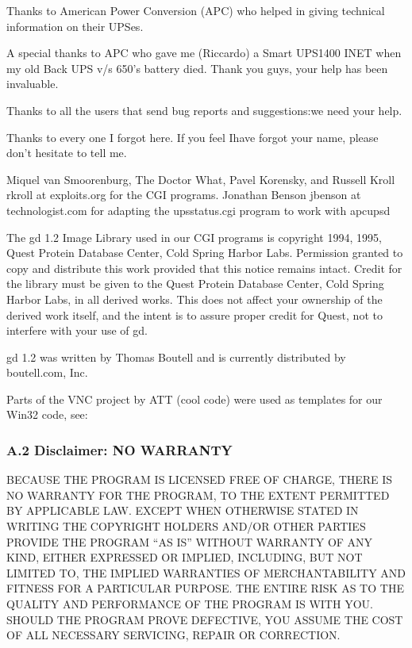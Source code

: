 Thanks to American Power Conversion (APC) who helped in giving technical
information on their UPSes.  

A special thanks to APC who gave me (Riccardo) a Smart UPS1400 INET when my
old Back UPS v/s 650's battery died.  Thank you guys, your help has been
invaluable.  

Thanks to all the users that send bug reports and suggestions:we need your
help.  

Thanks to every one I forgot here. If you feel Ihave forgot your name, please
don't hesitate to tell me.  

Miquel van Smoorenburg, The Doctor What, Pavel Korensky, and Russell Kroll
\lt{}rkroll at exploits.org\gt{} for the CGI programs. Jonathan Benson
\lt{}jbenson at technologist.com\gt{} for adapting the upsstatus.cgi program
to work with apcupsd  

The gd 1.2 Image Library used in our CGI programs is copyright 1994, 1995,
Quest Protein Database Center, Cold Spring Harbor Labs. Permission granted to
copy and distribute this work provided that this notice remains intact. Credit
for the library must be given to the Quest Protein Database Center, Cold
Spring Harbor Labs, in all derived works. This does not affect your ownership
of the derived work itself, and the intent is to assure proper credit for
Quest, not to interfere with your use of gd.  

gd 1.2 was written by Thomas Boutell and is currently distributed by
boutell.com, Inc.  

Parts of the VNC project by ATT (cool code) were used as templates for our
Win32 code, see: 


\label{Disclaimer_003b-NO-WARRANTY}

\subsubsection*{A.2 Disclaimer: NO WARRANTY}

\label{index-Disclaimer-264}
BECAUSE THE PROGRAM IS LICENSED FREE OF CHARGE, THERE IS NO WARRANTY FOR THE
PROGRAM, TO THE EXTENT PERMITTED BY APPLICABLE LAW. EXCEPT WHEN OTHERWISE
STATED IN WRITING THE COPYRIGHT HOLDERS AND/OR OTHER PARTIES PROVIDE THE
PROGRAM ``AS IS'' WITHOUT WARRANTY OF ANY KIND, EITHER EXPRESSED OR IMPLIED,
INCLUDING, BUT NOT LIMITED TO, THE IMPLIED WARRANTIES OF MERCHANTABILITY AND
FITNESS FOR A PARTICULAR PURPOSE. THE ENTIRE RISK AS TO THE QUALITY AND
PERFORMANCE OF THE PROGRAM IS WITH YOU. SHOULD THE PROGRAM PROVE DEFECTIVE,
YOU ASSUME THE COST OF ALL NECESSARY SERVICING, REPAIR OR CORRECTION.  

